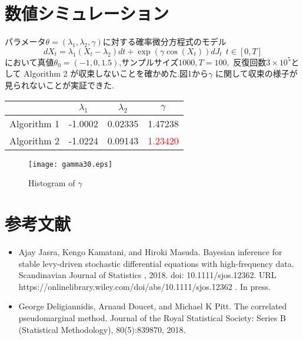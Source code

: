\documentclass[portrait,a0]{a0poster}
\begin{document}
\section{数値シミュレーション}
パラメータ$\theta=(\lambda_1,\lambda_2,\gamma)$に対する確率微分方程式のモデル$$
dX_{t} = \lambda_1(X_{t} - \lambda_2)dt + \exp(\gamma \cos(X_{t}))dJ_{t} ~~t\in [0,T] 
$$
において真値$\theta_0 = (-1,0,1.5)$,サンプルサイズ$1000,T=100,$ 反復回数$3 \times 10^5$として Algorithm 2 が収束しないことを確かめた.図1から$\gamma$ に関して収束の様子が見られないことが実証できた.
\begin{center}
    \begin{tabular}{lccc}
         &$\lambda_{1}$& $\lambda_{2}$&$\gamma$ \\ \midrule
         Algorithm 1&-1.0002&0.02335&1.47238\\ \midrule
         Algorithm 2&-1.0224&0.09143&
         \textcolor{red}{1.23420} \\ \bottomrule
    \end{tabular}
\end{center}  
\begin{figure}[H]
    \centering
    \texttt{[image: gamma30.eps]}
    \caption{Histogram of $\gamma$}
    \label{Histogram of $\gamma$}
\end{figure}
\section{参考文献}
\begin{itemize}
\item Ajay Jasra, Kengo Kamatani, and Hiroki Masuda. Bayesian inference for stable levy-driven stochastic differential equations with high-frequency data.
Scandinavian Journal of Statistics
, 2018. doi: 10.1111/sjos.12362. URL
https://onlinelibrary.wiley.com/doi/abs/10.1111/sjos.12362
. In press.

\item George Deligiannidis, Arnaud Doucet, and Michael K Pitt. The correlated
pseudomarginal method. Journal of the Royal Statistical Society: Series
B (Statistical Methodology), 80(5):839{870, 2018.}

\end{itemize}
\end{document}
